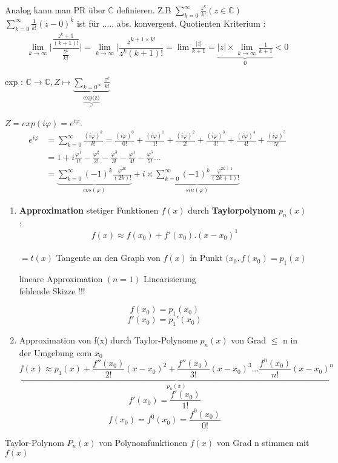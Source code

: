 \begin{remark}
Analog kann man PR über $\mathbb{C}$ definieren.
Z.B $\sum_{k=0}^{\infty}{\frac{z^k}{k!}}(z \in \mathbb{C})$ 
$\sum_{k=0}^{\infty}{\frac{1}{k!}(z-0)^k}$ ist für ..... abs. konvergent.
Quotienten Kriterium : 
\begin{align*}
\lim_{k \to \infty}{\bigg| \dfrac{\frac{z^k+1}{(k+1)!}}{\frac{z^k}{k!}}\bigg|} = \lim_{k \to \infty}{\bigg|\dfrac{z^{k+1 \times k!}}{z^k(k+1)!}} = \lim{\frac{|z|}{k+1}} = \underbrace{|z|\times \lim_{k \to \infty}{\frac{1}{k+1}}}_{0}<0
\end{align*} 

exp : $\mathbb{C} \rightarrow \mathbb{C} , Z \longmapsto  \underbrace{\sum_{k=0^{\infty}}{\frac{z^k}{k!}}}_{\underbrace{\text{exp(z)}}_{e^z}}$

$Z = exp(i \varphi)= e ^{i \varphi}$.
\begin{align*}
e ^{i \varphi} &= \sum_{k=0}^{\infty}{\frac{(i \varphi)^k}{k!}} = \frac{(i \varphi)^0}{0!} + \frac{(i \varphi)^1}{1!} + \frac{(i \varphi)^2}{2!} + \frac{(i \varphi)^3}{3!} + \frac{(i \varphi)^4}{4!} + \frac{(i \varphi)^5}{5!}\\
 &= 1 +  i \frac{\varphi^1}{1!} - \frac{\varphi^2}{2!} - \frac{\varphi^3}{3!} - \frac{\varphi^4}{4!} - \frac{\varphi^5}{5!} \dots \\
 &= \underbrace{\sum_{k=0}^{\infty}{(-1)^k \frac{\varphi^{2k}}{(2k)!}}}_{cos(\varphi)} + i \times \underbrace{\sum_{k=0}^{\infty}{(-1)^k \frac{\varphi^{2k+1}}{(2k+1)!}}}_{sin(\varphi)}
\end{align*}
\end{remark}
\begin{enumerate}
\item \textbf{Approximation} stetiger Funktionen $f(x)$ durch \textbf{Taylorpolynom} $p_n(x)$ :
$$f(x) \approx f(x_0)+f'(x_0).(x-x_0)^1$$\\
$= t(x)$ Tangente an den Graph von $f(x)$ in Punkt $(x_0 , f(x_0) = p_1(x)$
 
lineare Approximation $(n=1)$
Linearisierung\\
fehlende Skizze !!! 

\begin{remark}
\[ f(x_0)= p_1(x_0) \]
\[ f'(x_0)= p_1'(x_0) \]
\end{remark}

\item Approximation von f(x) durch Taylor-Polynome $p_n(x)$ von Grad $\leq$ n in der Umgebung com $x_0$
\[ \underbrace{f(x) \approx p_1(x) + 
\frac{f''(x_0)}{2!}(x-x_0)^2 +
\frac{f''(x_0)}{3!}(x-x_0)^3 \dots
\frac{f^n(x_0)}{n!}(x-x_0)^n}_{p_n(x)}\]
\[f'(x_0) = \frac{f'(x_0)}{1!} \]
\[f(x_0) = f^0(x_0) = \frac{f^0(x_0)}{0!}\]
\end{enumerate}
\begin{remark}
Taylor-Polynom $P_n(x)$ von Polynomfunktionen $f(x)$ von Grad n stimmen mit  $f(x)$ 
\end{remark}

